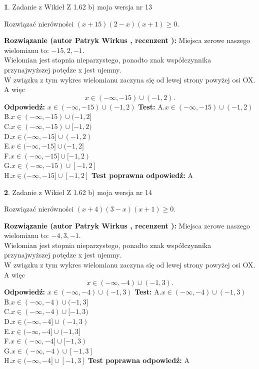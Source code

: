 \documentclass[12pt, a4paper]{article}
\theoremstyle{definition} %
\newtheorem{zad}{}
\newcommand{\zadStart}[1]{\begin{zad}#1\newline}
\newcommand{\zadStop}{\end{zad}}
\newcommand{\rozwStart}[2]{\noindent \textbf{Rozwiązanie (autor #1 , recenzent #2): }\newline}
\newcommand{\rozwStop}{\newline}
\newcommand{\odpStart}{\noindent \textbf{Odpowiedź:}\newline}
\newcommand{\odpStop}{\newline}
\newcommand{\testStart}{\noindent \textbf{Test:}\newline}
\newcommand{\testStop}{\newline}
\newcommand{\kluczStart}{\noindent \textbf{Test poprawna odpowiedź:}\newline}
\newcommand{\kluczStop}{\newline}
\begin{document}
\zadStart{Zadanie z Wikieł Z 1.62 b) moja wersja nr 13}

Rozwiązać nierówności $(x+15)(2-x)(x+1)\ge0$.
\zadStop
\rozwStart{Patryk Wirkus}{}
Miejsca zerowe naszego wielomianu to: $-15, 2, -1$.\\
Wielomian jest stopnia nieparzystego, ponadto znak współczynnika przy\linebreak najwyższej potędze x jest ujemny.\\ W związku z tym wykres wielomianu zaczyna się od lewej strony powyżej osi OX. A więc $$x \in (-\infty,-15) \cup (-1,2).$$
\rozwStop
\odpStart
$x \in (-\infty,-15) \cup (-1,2)$
\odpStop
\testStart
A.$x \in (-\infty,-15) \cup (-1,2)$\\
B.$x \in (-\infty,-15) \cup (-1,2]$\\
C.$x \in (-\infty,-15) \cup [-1,2)$\\
D.$x \in (-\infty,-15] \cup (-1,2)$\\
E.$x \in (-\infty,-15] \cup (-1,2]$\\
F.$x \in (-\infty,-15] \cup [-1,2)$\\
G.$x \in (-\infty,-15) \cup [-1,2]$\\
H.$x \in (-\infty,-15] \cup [-1,2]$
\testStop
\kluczStart
A
\kluczStop



\zadStart{Zadanie z Wikieł Z 1.62 b) moja wersja nr 14}

Rozwiązać nierówności $(x+4)(3-x)(x+1)\ge0$.
\zadStop
\rozwStart{Patryk Wirkus}{}
Miejsca zerowe naszego wielomianu to: $-4, 3, -1$.\\
Wielomian jest stopnia nieparzystego, ponadto znak współczynnika przy\linebreak najwyższej potędze x jest ujemny.\\ W związku z tym wykres wielomianu zaczyna się od lewej strony powyżej osi OX. A więc $$x \in (-\infty,-4) \cup (-1,3).$$
\rozwStop
\odpStart
$x \in (-\infty,-4) \cup (-1,3)$
\odpStop
\testStart
A.$x \in (-\infty,-4) \cup (-1,3)$\\
B.$x \in (-\infty,-4) \cup (-1,3]$\\
C.$x \in (-\infty,-4) \cup [-1,3)$\\
D.$x \in (-\infty,-4] \cup (-1,3)$\\
E.$x \in (-\infty,-4] \cup (-1,3]$\\
F.$x \in (-\infty,-4] \cup [-1,3)$\\
G.$x \in (-\infty,-4) \cup [-1,3]$\\
H.$x \in (-\infty,-4] \cup [-1,3]$
\testStop
\kluczStart
A
\kluczStop
\end{document}
